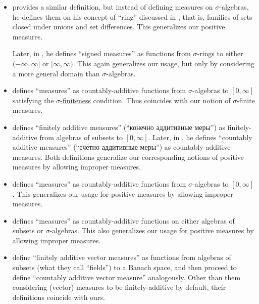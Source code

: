\begin{remark}
\begin{itemize}
    \item {} provides a similar definition, but instead of defining measures on \( \sigma \)-algebras, he defines them on his concept of \enquote{ring} discussed in , that is, families of sets closed under unions and set differences. This generalizes our positive measures.

    Later, in , he defines \enquote{signed measures} as functions from \( \sigma \)-rings to either \( (-\infty, \infty] \) or \( [\infty, \infty) \). This again generalizes our usage, but only by considering a more general domain than \( \sigma \)-algebras.

    \item {} defines \enquote{measures} as countably-additive functions from \( \sigma \)-algebras to \( [0, \infty] \) satisfying the \hyperref[def:sigma_finite_measure]{\( \sigma \)-finiteness} condition. Thus coincides with our notion of \( \sigma \)-finite measures.

    \item {} defines \enquote{finitely additive measures} (\enquote{конечно аддитивные меры}) as finitely-additive from algebras of subsets to \( [0, \infty] \). Later, in \cite[def. I.1.6]{Ширяев2007ВероятностиТом1}, he defines \enquote{countably additive measures} (\enquote{счётно аддитивные меры}) as countably-additive measures. Both definitions generalize our corresponding notions of positive measures by allowing improper measures.

    \item {} defines \enquote{measures} as countably-additive functions from \( \sigma \)-algebras to \( [0, \infty] \). This generalizes our usage for positive measures by allowing improper measures.

    \item {} defines \enquote{measures} as countably-additive functions on either algebras of subsets or \( \sigma \)-algebras. This also generalizes our usage for positive measures by allowing improper measures.

    \item {} define \enquote{finitely additive vector measures} as functions from algebras of subsets (what they call \enquote{fields}) to a Banach space, and then proceed to define \enquote{countably additive vector measure} analogously. Other than them considering (vector) measures to be finitely-additive by default, their definitions coincide with ours.


\end{itemize}
\end{remark}
